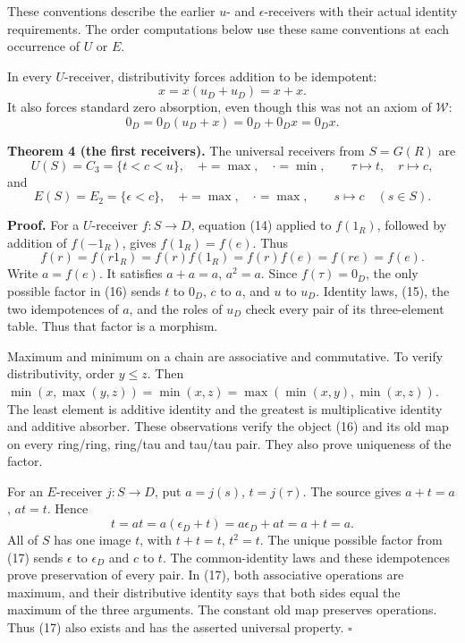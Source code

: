 \documentclass[
]{article}
\begin{document}
These conventions describe the earlier \(u\)- and \(\epsilon\)-receivers
with their actual identity requirements. The order computations below
use these same conventions at each occurrence of \(U\) or \(E\).

In every \(U\)-receiver, distributivity forces addition to be
idempotent: \[
x=x(u_D+u_D)=x+x.
\tag{14}
\] It also forces standard zero absorption, even though this was not an
axiom of \(\mathcal W\): \[
0_D=0_D(u_D+x)=0_D+0_Dx=0_Dx.
\tag{15}
\]

\textbf{Theorem 4 (the first receivers).} The universal receivers from
\(S=G(R)\) are \[
U(S)=C_3=\{t<c<u\},\quad +=\max,\quad\cdot=\min,\qquad
\tau\mapsto t,\quad r\mapsto c,
\tag{16}
\] and \[
E(S)=E_2=\{\epsilon<c\},\quad +=\max,\quad\cdot=\max,\qquad
s\mapsto c\quad(s\in S).
\tag{17}
\]

\textbf{Proof.} For a \(U\)-receiver \(f:S\to D\), equation (14) applied
to \(f(1_R)\), followed by addition of \(f(-1_R)\), gives
\(f(1_R)=f(e)\). Thus \[
f(r)=f(r1_R)=f(r)f(1_R)=f(r)f(e)=f(re)=f(e).
\] Write \(a=f(e)\). It satisfies \(a+a=a\), \(a^2=a\). Since
\(f(\tau)=0_D\), the only possible factor in (16) sends \(t\) to
\(0_D\), \(c\) to \(a\), and \(u\) to \(u_D\). Identity laws, (15), the
two idempotences of \(a\), and the roles of \(u_D\) check every pair of
its three-element table. Thus that factor is a morphism.

Maximum and minimum on a chain are associative and commutative. To
verify distributivity, order \(y\le z\). Then
\(\min(x,\max(y,z))=\min(x,z)=\max(\min(x,y),\min(x,z))\). The least
element is additive identity and the greatest is multiplicative identity
and additive absorber. These observations verify the object (16) and its
old map on every ring/ring, ring/tau and tau/tau pair. They also prove
uniqueness of the factor.

For an \(E\)-receiver \(j:S\to D\), put \(a=j(s)\), \(t=j(\tau)\). The
source gives \(a+t=a\), \(at=t\). Hence \[
t=at=a(\epsilon_D+t)=a\epsilon_D+at=a+t=a.
\] All of \(S\) has one image \(t\), with \(t+t=t\), \(t^2=t\). The
unique possible factor from (17) sends \(\epsilon\) to \(\epsilon_D\)
and \(c\) to \(t\). The common-identity laws and these idempotences
prove preservation of every pair. In (17), both associative operations
are maximum, and their distributive identity says that both sides equal
the maximum of the three arguments. The constant old map preserves
operations. Thus (17) also exists and has the asserted universal
property. \(\square\)
\end{document}

